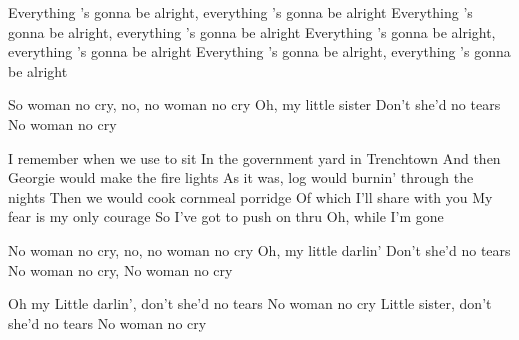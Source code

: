 \beginverse
Everything 's gonna be alright, everything 's gonna be alright
Everything 's gonna be alright, everything 's gonna be alright
Everything 's gonna be alright, everything 's gonna be alright
Everything 's gonna be alright, everything 's gonna be alright
\endverse

\beginverse
So woman no cry, no, no woman no cry
Oh, my little sister
Don't she'd no tears
No woman no cry
\endverse

\beginverse
I remember when we use to sit
In the government yard in Trenchtown
And then Georgie would make the fire lights
As it was, log would burnin' through the nights
Then we would cook cornmeal porridge
Of which I'll share with you
My fear is my only courage
So I've got to push on thru
Oh, while I'm gone
\endverse

\beginverse
No woman no cry, no, no woman no cry
Oh, my little darlin'
Don't she'd no tears
No woman no cry, No woman no cry
\endverse

\beginverse
Oh my Little darlin', don't she'd no tears
No woman no cry
Little sister, don't she'd no tears
No woman no cry
\endverse
\endsong

